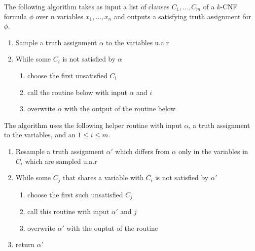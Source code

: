 \documentclass{article}
\begin{document}
\begin{algorithm}
  The following algorithm takes as input a list of clauses $C_1,...,C_m$ of a $k$-CNF
  formula $\phi$ over $n$ variables $x_1,\ldots,x_n$ and outputs a satisfying truth
  assignment for $\phi$.

  \begin{enumerate}
    \item Sample a truth assignment $\alpha$ to the variables u.a.r
    \item While some $C_i$ is not satisfied by $\alpha$
      \begin{enumerate}
        \item choose the first unsatisfied $C_i$
        \item call the routine below with input $\alpha$ and $i$
        \item overwrite $\alpha$ with the output of the routine below
      \end{enumerate}
  \end{enumerate}
  The algorithm uses the following helper routine with input $\alpha$, a truth assignment
  to the variables, and an $1\leq i\leq m$.
  \begin{enumerate}
    \item Resample a truth assignment $\alpha'$ which differs from $\alpha$ only in the variables
      in $C_i$ which are sampled u.a.r
    \item While some $C_j$ that shares a variable with $C_i$ is not satisfied by $\alpha'$
      \begin{enumerate}
        \item choose the first such unsatisfied $C_j$
        \item call this routine with input $\alpha'$ and $j$
        \item overwrite $\alpha'$ with the ouptut of the routine
      \end{enumerate}
    \item return $\alpha'$
  \end{enumerate}
\end{algorithm}
\end{document}
